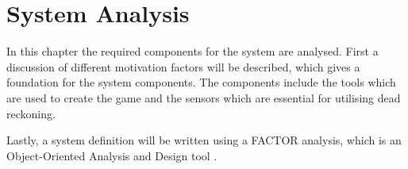 \chapter{System Analysis}\label{chapter:system-analysis}
In this chapter the required components for the system are analysed. 
First a discussion of different motivation factors will be described, which gives a foundation for the system components.
The components include the tools which are used to create the game and the sensors which are essential for utilising dead reckoning.

Lastly, a system definition will be written using a FACTOR analysis, which is an Object-Oriented Analysis and Design tool \citep{book:OOAD}. 


%


